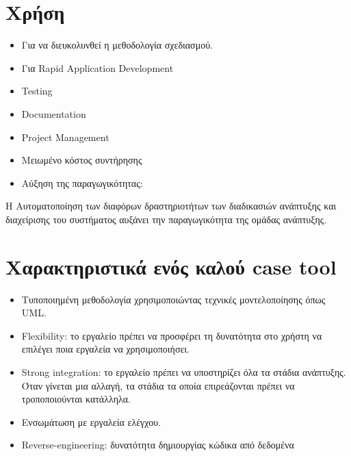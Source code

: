     \section{Χρήση}
	\begin{itemize}
	\item Για να διευκολυνθεί η μεθοδολογία σχεδιασμού. 
	\item Για Rapid Application Development
	\item Testing
	\item Documentation
	\item Project Management
	\item Μειωμένο κόστος συντήρησης
	\item Αύξηση της παραγωγικότητας:
	\end{itemize}
	H Αυτοματοποίηση των διαφόρων δραστηριοτήτων των διαδικασιών ανάπτυξης και διαχείρισης του συστήματος αυξάνει την παραγωγικότητα της ομάδας ανάπτυξης.
	
	\section{Χαρακτηριστικά ενός καλού case tool}
	\begin{itemize}
	\item Τυποποιημένη μεθοδολογία χρησιμοποιώντας τεχνικές μοντελοποίησης όπως UML.
	\item Flexibility: το εργαλείο πρέπει να προσφέρει τη δυνατότητα στο χρήστη να επιλέγει ποια εργαλεία να χρησιμοποιήσει.
	\item Strong integration: το εργαλείο πρέπει να υποστηρίζει όλα τα στάδια ανάπτυξης. Όταν γίνεται μια αλλαγή, τα στάδια τα οποία επιρεάζονται πρέπει να τροποποιούνται κατάλληλα.
	\item Ενσωμάτωση με εργαλεία ελέγχου.
	\item Reverse-engineering: δυνατότητα δημιουργίας κώδικα από δεδομένα
	\end{itemize}